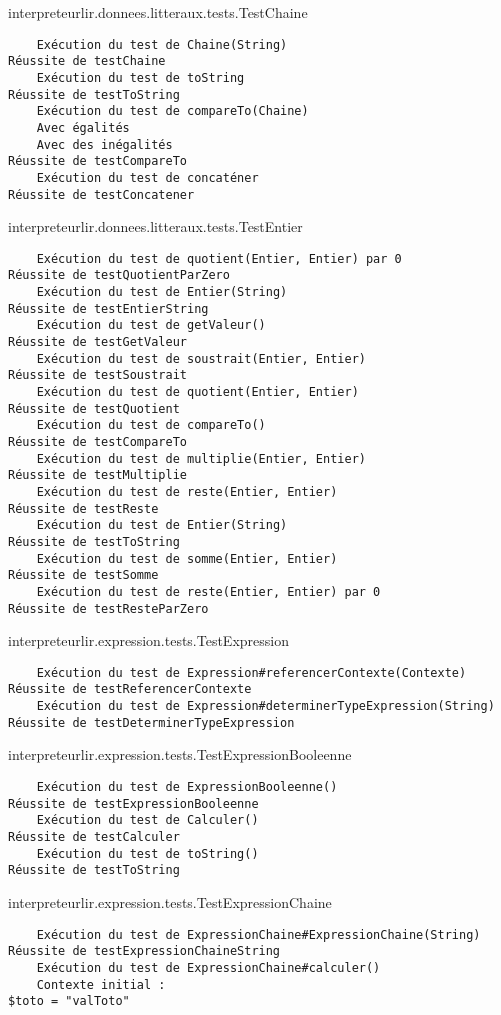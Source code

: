 \begin{enum}
    \item interpreteurlir.donnees.litteraux.tests.TestChaine
\begin{verbatim}
    Exécution du test de Chaine(String)
Réussite de testChaine
    Exécution du test de toString
Réussite de testToString
    Exécution du test de compareTo(Chaine)
    Avec égalités
    Avec des inégalités
Réussite de testCompareTo
    Exécution du test de concaténer
Réussite de testConcatener
\end{verbatim}

    \item interpreteurlir.donnees.litteraux.tests.TestEntier
\begin{verbatim}
    Exécution du test de quotient(Entier, Entier) par 0
Réussite de testQuotientParZero
    Exécution du test de Entier(String)
Réussite de testEntierString
    Exécution du test de getValeur()
Réussite de testGetValeur
    Exécution du test de soustrait(Entier, Entier)
Réussite de testSoustrait
    Exécution du test de quotient(Entier, Entier)
Réussite de testQuotient
    Exécution du test de compareTo()
Réussite de testCompareTo
    Exécution du test de multiplie(Entier, Entier)
Réussite de testMultiplie
    Exécution du test de reste(Entier, Entier)
Réussite de testReste
    Exécution du test de Entier(String)
Réussite de testToString
    Exécution du test de somme(Entier, Entier)
Réussite de testSomme
    Exécution du test de reste(Entier, Entier) par 0
Réussite de testResteParZero
\end{verbatim}

    \item interpreteurlir.expression.tests.TestExpression
\begin{verbatim}
    Exécution du test de Expression#referencerContexte(Contexte)
Réussite de testReferencerContexte
    Exécution du test de Expression#determinerTypeExpression(String)
Réussite de testDeterminerTypeExpression
\end{verbatim}

    \item interpreteurlir.expression.tests.TestExpressionBooleenne
\begin{verbatim}
    Exécution du test de ExpressionBooleenne()
Réussite de testExpressionBooleenne
    Exécution du test de Calculer()
Réussite de testCalculer
    Exécution du test de toString()
Réussite de testToString
\end{verbatim}

    \item interpreteurlir.expression.tests.TestExpressionChaine
\begin{verbatim}
    Exécution du test de ExpressionChaine#ExpressionChaine(String)
Réussite de testExpressionChaineString
    Exécution du test de ExpressionChaine#calculer()
    Contexte initial : 
$toto = "valToto"


\end{verbatim}
\end{enum}
